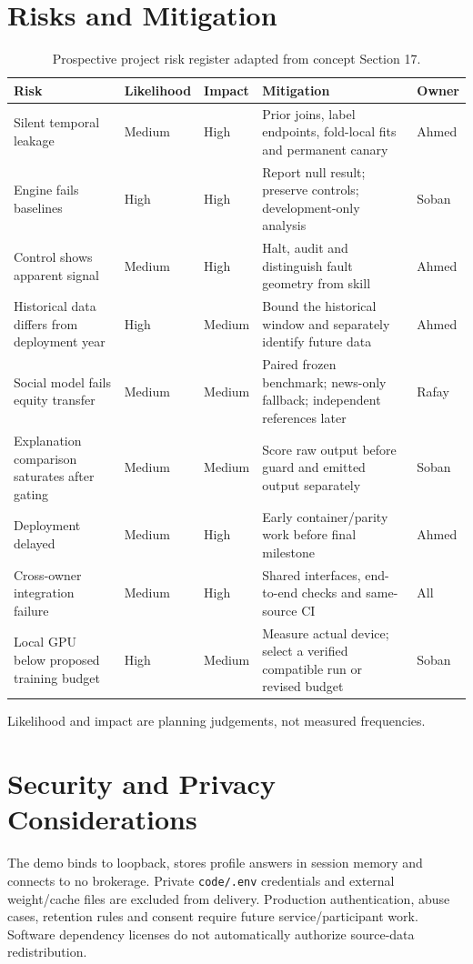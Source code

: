 \section{Risks and Mitigation}
\begingroup\small
\begin{longtable}{p{}p{}p{}p{}p{}}
\caption{Prospective project risk register adapted from concept Section 17.}\label{tab:risk-register}\\\toprule Risk & Likelihood & Impact & Mitigation & Owner\\\midrule
Silent temporal leakage & Medium & High & Prior joins, label endpoints, fold-local fits and permanent canary & Ahmed\\
Engine fails baselines & High & High & Report null result; preserve controls; development-only analysis & Soban\\
Control shows apparent signal & Medium & High & Halt, audit and distinguish fault geometry from skill & Ahmed\\
Historical data differs from deployment year & High & Medium & Bound the historical window and separately identify future data & Ahmed\\
Social model fails equity transfer & Medium & Medium & Paired frozen benchmark; news-only fallback; independent references later & Rafay\\
Explanation comparison saturates after gating & Medium & Medium & Score raw output before guard and emitted output separately & Soban\\
Deployment delayed & Medium & High & Early container/parity work before final milestone & Ahmed\\
Cross-owner integration failure & Medium & High & Shared interfaces, end-to-end checks and same-source CI & All\\
Local GPU below proposed training budget & High & Medium & Measure actual device; select a verified compatible run or revised budget & Soban\\
\bottomrule\end{longtable}\endgroup
Likelihood and impact are planning judgements, not measured frequencies.
\section{Security and Privacy Considerations}
The demo binds to loopback, stores profile answers in session memory and connects to no brokerage. Private \nolinkurl{code/.env} credentials and external weight/cache files are excluded from delivery. Production authentication, abuse cases, retention rules and consent require future service/participant work. Software dependency licenses do not automatically authorize source-data redistribution.
\clearpage
